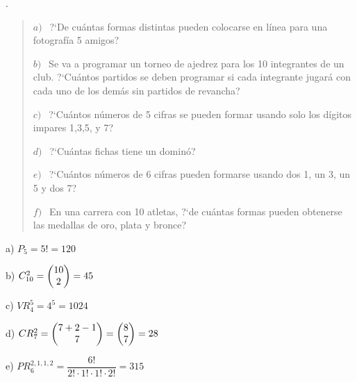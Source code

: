 \vspace{1cm} %
	

\vspace{1cm} %
	
\begin{ejemplo}
\begin{ejre}
	. 
\begin{quotation}		

	$a)\ \ $ ?`De cuántas formas distintas pueden colocarse en línea para una fotografía 5 amigos?
	
	$b)\ \ $ Se va a programar un torneo de ajedrez para los 10 integrantes de un club. ?`Cuántos partidos se deben programar si cada integrante jugará con cada uno de los demás sin partidos de revancha?
	
	$c)\ \ $ ?`Cuántos números de 5 cifras se pueden formar usando solo los dígitos impares 1,3,5, y 7?
	
	$d)\ \ $ ?`Cuántas fichas tiene un dominó?
	
	$e)\ \ $ ?`Cuántos números de 6 cifras pueden formarse usando dos 1, un 3, un 5 y dos 7?	
	
	$f)\ \ $ En una carrera con 10 atletas, ?`de cuántas formas pueden obtenerse las medallas de oro, plata y bronce?

\end{quotation}
\end{ejre}
\end{ejemplo}

	
	\hspace{2cm} a) $P_5=5!=120$
	
	\hspace{2cm} b) $C_{10}^2=\mqty(10\\2)=45$
	
	\hspace{2cm} c) $VR_4^5=4^5=1024$	
	
	\hspace{2cm} d) $CR_7^2=\mqty(7+2-1\\7)=\mqty(8\\7)=28$
	
	\hspace{2cm} e) $PR_6^{2,1,1,2}=\dfrac{6!}{2!\cdot 1!\cdot 1!\cdot 2!}=315$
	
